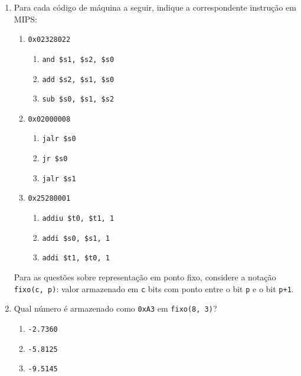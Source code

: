\documentclass{article}
\begin{document}
\begin{enumerate}
\begin{spacing}{1.5}
\begin{enumerate}
\end{enumerate}
\end{spacing}
\bigskip

\break

\item \large Para cada código de máquina a seguir, indique a correspondente instrução em MIPS:

\begin{spacing}{1.5}
\begin{enumerate}
\item \verb|0x02328022|

\begin{enumerate}
\item \verb|and $s1, $s2, $s0|
\item \verb|add $s2, $s1, $s0|
\item \verb|sub $s0, $s1, $s2|%
\end{enumerate}

\item \verb|0x02000008|

\begin{enumerate}
\item \verb|jalr $s0|
\item \verb|jr $s0|%
\item \verb|jalr $s1|
\end{enumerate}

\item \verb|0x25280001|

\begin{enumerate}
\item \verb|addiu $t0, $t1, 1|%
\item \verb|addi $s0, $s1, 1|
\item \verb|addi $t1, $t0, 1|
\end{enumerate}

\end{enumerate}
\end{spacing}
\bigskip

Para as questões sobre representação em ponto fixo, considere a notação \\
\verb|fixo(c, p)|: valor armazenado em \verb|c| bits com ponto entre o bit \verb|p| e o bit \verb|p+1|.

\item \large Qual número é armazenado como \verb|0xA3| em \verb|fixo(8, 3)|?

\smallskip

\begin{enumerate}
\item \verb|-2.7360|
\item \verb|-5.8125|%
\item \verb|-9.5145|
\end{enumerate}


\end{enumerate}
\end{document}
